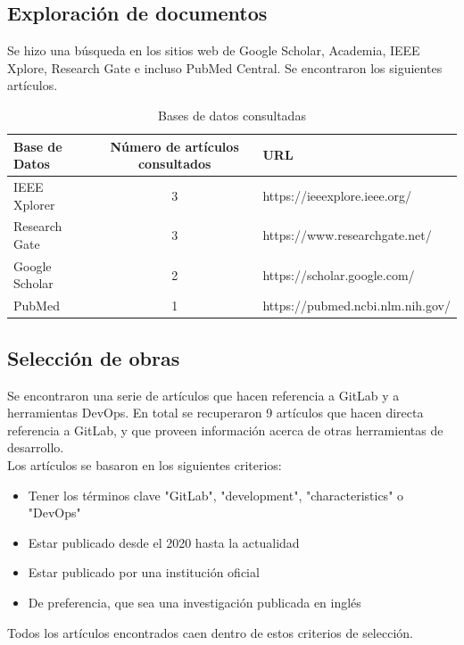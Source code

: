 \documentclass[runningheads]{llncs}
\begin{document}
\subsection{Exploración de documentos}
Se hizo una búsqueda en los sitios web de Google Scholar, Academia, IEEE Xplore, Research Gate e incluso PubMed Central.
Se encontraron los siguientes artículos.
\begin{table}[ht!]
        \centering
        \caption{Bases de datos consultadas}
        \begin{tabular}{l | c | l}
                Base de Datos & Número de artículos consultados & URL \\
                \hline
                \hline
                IEEE Xplorer & 3 & https://ieeexplore.ieee.org/ \\
                Research Gate & 3 & https://www.researchgate.net/ \\
                Google Scholar & 2 & https://scholar.google.com/ \\
                PubMed & 1 & https://pubmed.ncbi.nlm.nih.gov/ \\
                \hline
        \end{tabular}
        \label{table:1}
\end{table}
\subsection{Selección de obras}
Se encontraron una serie de artículos que hacen referencia a GitLab y a herramientas DevOps. En total se
recuperaron 9 artículos que hacen directa referencia a GitLab, y que proveen información acerca de otras
herramientas de desarrollo.\\
Los artículos se basaron en los siguientes criterios:
\begin{itemize}
        \item Tener los términos clave "GitLab", "development", "characteristics" o "DevOps"
        \item Estar publicado desde el 2020 hasta la actualidad
        \item Estar publicado por una institución oficial
        \item De preferencia, que sea una investigación publicada en inglés
\end{itemize}
Todos los artículos encontrados caen dentro de estos criterios de selección.
\end{document}
